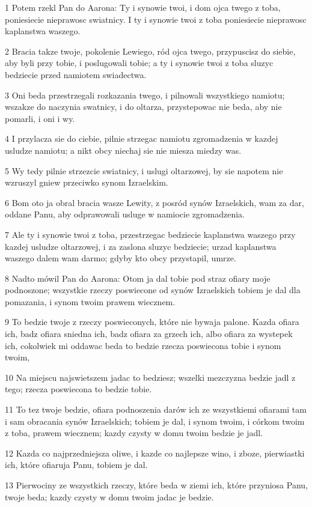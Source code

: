 \par 1 Potem rzekl Pan do Aarona: Ty i synowie twoi, i dom ojca twego z toba, poniesiecie nieprawosc swiatnicy. I ty i synowie twoi z toba poniesiecie nieprawosc kaplanstwa waszego.
\par 2 Bracia takze twoje, pokolenie Lewiego, ród ojca twego, przypuscisz do siebie, aby byli przy tobie, i poslugowali tobie; a ty i synowie twoi z toba sluzyc bedziecie przed namiotem swiadectwa.
\par 3 Oni beda przestrzegali rozkazania twego, i pilnowali wszystkiego namiotu; wszakze do naczynia swatnicy, i do oltarza, przystepowac nie beda, aby nie pomarli, i oni i wy.
\par 4 I przylacza sie do ciebie, pilnie strzegac namiotu zgromadzenia w kazdej usludze namiotu; a nikt obcy niechaj sie nie miesza miedzy was.
\par 5 Wy tedy pilnie strzezcie swiatnicy, i uslugi oltarzowej, by sie napotem nie wzruszyl gniew przeciwko synom Izraelskim.
\par 6 Bom oto ja obral bracia wasze Lewity, z posród synów Izraelskich, wam za dar, oddane Panu, aby odprawowali usluge w namiocie zgromadzenia.
\par 7 Ale ty i synowie twoi z toba, przestrzegac bedziecie kaplanstwa waszego przy kazdej usludze oltarzowej, i za zaslona sluzyc bedziecie; urzad kaplanstwa waszego dalem wam darmo; gdyby kto obcy przystapil, umrze.
\par 8 Nadto mówil Pan do Aarona: Otom ja dal tobie pod straz ofiary moje podnoszone; wszystkie rzeczy poswiecone od synów Izraelskich tobiem je dal dla pomazania, i synom twoim prawem wiecznem.
\par 9 To bedzie twoje z rzeczy poswieconych, które nie bywaja palone. Kazda ofiara ich, badz ofiara sniedna ich, badz ofiara za grzech ich, albo ofiara za wystepek ich, cokolwiek mi oddawac beda to bedzie rzecza poswiecona tobie i synom twoim,
\par 10 Na miejscu najswietszem jadac to bedziesz; wszelki mezczyzna bedzie jadl z tego; rzecza poswiecona to bedzie tobie.
\par 11 To tez twoje bedzie, ofiara podnoszenia darów ich ze wszystkiemi ofiarami tam i sam obracania synów Izraelskich; tobiem je dal, i synom twoim, i córkom twoim z toba, prawem wiecznem; kazdy czysty w domu twoim bedzie je jadl.
\par 12 Kazda co najprzedniejsza oliwe, i kazde co najlepsze wino, i zboze, pierwiastki ich, które ofiaruja Panu, tobiem je dal.
\par 13 Pierwociny ze wszystkich rzeczy, które beda w ziemi ich, które przyniosa Panu, twoje beda; kazdy czysty w domu twoim jadac je bedzie.
